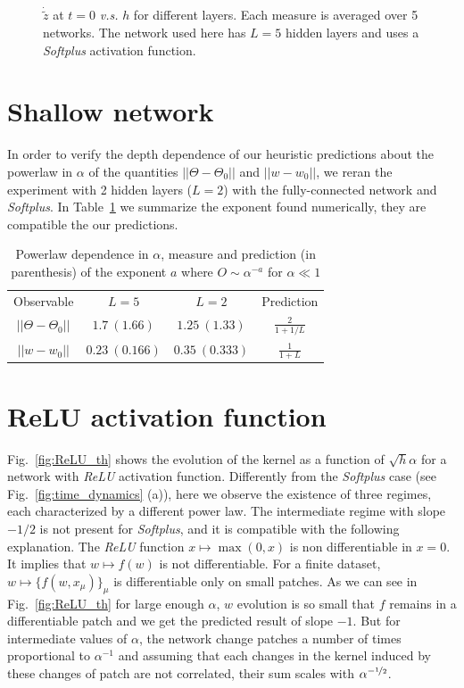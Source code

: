 \documentclass{article}
\newcommand{\abs}[1]{|\!|#1|\!|}
\newcommand{\taref}[1]{Table~\ref{#1}}
\newcommand{\fref}[1]{Fig.~\ref{#1}}
\begin{document}
\begin{figure}[ht]
    \centering
    \caption{$\dot{\tilde{z}}$ at $t=0$ {\it v.s.} $h$ for different layers. Each measure is averaged over 5 networks.
    The network used here has $L=5$ hidden layers and uses a \textit{Softplus} activation function. 
    \label{fig:dot_z}}
\end{figure}


\section{Shallow network}
\label{app:shallow}
In order to verify the depth dependence of our heuristic predictions about the powerlaw in $\alpha$ of the quantities $\abs{ \Theta - \Theta_0 }$ and $\abs{ w - w_0 }$, we reran the experiment with 2 hidden layers ($L=2$) with the fully-connected network and \textit{Softplus}.
In \taref{tab:thw} we summarize the exponent found numerically, they are compatible the our predictions.

\begin{table}[ht]
    \centering
    \begin{tabular}{c|c|c|c}
        Observable & $L=5$ & $L=2$ & Prediction \\
        $\abs{ \Theta - \Theta_0 }$ & $1.7\ (1.66)$ & $1.25\ (1.33)$ & $\frac{2}{1 + 1/L}$ \\
        $\abs{ w - w_0 }$ & $0.23\ (0.166)$ & $0.35\ (0.333)$ & $\frac{1}{1+L}$ \\
    \end{tabular}
    \caption{Powerlaw dependence in $\alpha$, measure and prediction (in parenthesis) of the exponent $a$ where $O \sim \alpha^{-a}$ for $\alpha \ll 1$}
    \label{tab:thw}
\end{table}


\section{ReLU activation function} \label{app:ReLU}

\fref{fig:ReLU_th} shows the evolution of the kernel as a function of $\sqrt{h}\alpha$ for a network with \textit{ReLU} activation function.
Differently from the \textit{Softplus} case (see \fref{fig:time_dynamics} (a)), here we observe the existence of three regimes, each characterized by a different power law.
The intermediate regime with slope $-1/2$ is not present for \textit{Softplus}, and it is compatible with the following explanation.
The \textit{ReLU} function $x \mapsto \max(0, x)$ is non differentiable in $x=0$.
It implies that $w \mapsto f(w)$ is not differentiable.
For a finite dataset, $w \mapsto \{ f(w, x_\mu) \}_\mu$ is differentiable only on small patches.
As we can see in \fref{fig:ReLU_th} for large enough $\alpha$, $w$ evolution is so small that $f$ remains in a differentiable patch and we get the predicted result of slope $-1$.
But for intermediate values of $\alpha$, the network change patches a number of times proportional to $\alpha^{-1}$ and assuming that each changes in the kernel induced by these changes of patch are not correlated, their sum scales with $\alpha^{-\nicefrac{1}{2}}$.
\end{document}
